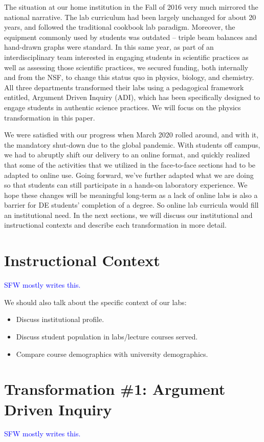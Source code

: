 \documentclass[aip, numerical, preprint]{revtex4-2}
\begin{document}
The situation at our home institution in the Fall of 2016 very much mirrored the national
narrative.  The lab curriculum had been largely unchanged for about 20 years, and followed the
traditional cookbook lab paradigm.  Moreover, the equipment commonly used by students was
outdated -- triple beam balances and hand-drawn graphs were standard.  In this same year, as
part of an interdisciplinary team interested in engaging students in scientific practices as
well as assessing those scientific practices, we secured funding, both internally and from the
NSF, to change this status quo in physics, biology, and chemistry.  All three departments
transformed their labs using a pedagogical framework entitled, Argument Driven Inquiry
(ADI),\cite{Sampson2011,Walker2011,Walker2016} which has been specifically designed to engage
students in authentic science practices. We will focus on the physics transformation in this
paper.

We were satisfied with our progress when March 2020 rolled around, and with it, the mandatory
shut-down due to the global pandemic.  With students off campus, we had to abruptly shift our
delivery to an online format, and quickly realized that some of the activities that we utilized
in the face-to-face sections had to be adapted to online use.  Going forward, we've further
adapted what we are doing so that students can still participate in a hands-on laboratory
experience.  We hope these changes will be meaningful long-term as a lack of online labs is
also a barrier for DE students' completion of a degree.  So online lab curricula would fill an
institutional need.  In the next sections, we will discuss our institutional and instructional
contexts and describe each transformation in more detail.

\section{Instructional Context}
\textcolor{blue}{SFW mostly writes this.}

We should also talk about the specific context of our labs:
\begin{itemize}
  \item Discuss institutional profile.
  \item Discuss student population in labs/lecture courses served.
  \item Compare course demographics with university demographics.
\end{itemize}

\section{Transformation \#1: Argument Driven Inquiry}
\textcolor{blue}{SFW mostly writes this.}
\end{document}
